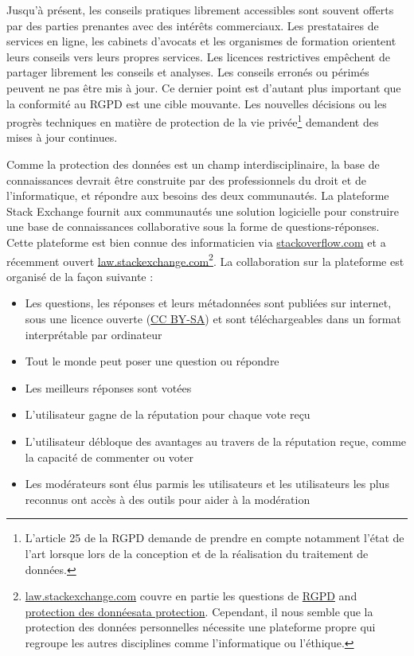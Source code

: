 \documentclass{scrlttr2}
\let\tightlist\relax
\begin{document}
\begin{letter}{}
Jusqu'à présent, les conseils pratiques librement accessibles sont
souvent offerts par des parties prenantes avec des intérêts commerciaux.
Les prestataires de services en ligne, les cabinets d'avocats et les
organismes de formation orientent leurs conseils vers leurs propres
services. Les licences restrictives empêchent de partager librement les
conseils et analyses. Les conseils erronés ou périmés peuvent ne pas
être mis à jour. Ce dernier point est d'autant plus important que la
conformité au RGPD est une cible mouvante. Les nouvelles décisions ou
les progrès techniques en matière de protection de la vie
privée\footnote{L'article 25 de la RGPD demande de prendre en compte
  notamment l'état de l'art lorsque lors de la conception et de la
  réalisation du traitement de données.} demandent des mises à jour
continues.

Comme la protection des données est un champ interdisciplinaire, la base
de connaissances devrait être construite par des professionnels du droit
et de l'informatique, et répondre aux besoins des deux communautés. La
plateforme Stack Exchange fournit aux communautés une solution
logicielle pour construire une base de connaissances collaborative sous
la forme de questions-réponses. Cette plateforme est bien connue des
informaticien via \href{http://stackoverflow.com/}{stackoverflow.com} et
a récemment ouvert
\href{https://law.stackexchange.com}{law.stackexchange.com}\footnote{\href{https://law.stackexchange.com}{law.stackexchange.com}
  couvre en partie les questions de
  \href{https://law.stackexchange.com/questions/tagged/gdpr}{RGPD} and
  \href{https://law.stackexchange.com/questions/tagged/gdpr+data-protection}{protection
  des donnéesata protection}. Cependant, il nous semble que la
  protection des données personnelles nécessite une plateforme propre
  qui regroupe les autres disciplines comme l'informatique ou l'éthique.}.
La collaboration sur la plateforme est organisé de la façon suivante :

\begin{itemize}
\tightlist
\item
  Les questions, les réponses et leurs métadonnées sont publiées sur
  internet, sous une licence ouverte
  (\href{https://creativecommons.org/licenses/by-sa/3.0/}{CC BY-SA}) et
  sont téléchargeables dans un format interprétable par ordinateur
\item
  Tout le monde peut poser une question ou répondre
\item
  Les meilleurs réponses sont votées
\item
  L'utilisateur gagne de la réputation pour chaque vote reçu
\item
  L'utilisateur débloque des avantages au travers de la réputation
  reçue, comme la capacité de commenter ou voter
\item
  Les modérateurs sont élus parmis les utilisateurs et les utilisateurs
  les plus reconnus ont accès à des outils pour aider à la modération
\end{itemize}


\end{letter}
\end{document}
